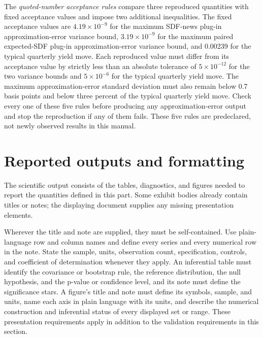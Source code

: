 \documentclass[11pt]{article}
\begin{document}
The \emph{quoted-number acceptance rules} compare three reproduced quantities with fixed acceptance
values and impose two additional inequalities. The fixed acceptance values are \(4.19\times10^{-9}\) for the maximum SDF-news plug-in approximation-error variance bound,
\(3.19\times10^{-9}\) for the maximum paired expected-SDF plug-in approximation-error variance bound, and 0.00239 for the typical quarterly
yield move. Each reproduced value must differ from its acceptance value by strictly less than an
absolute tolerance of \(5\times10^{-12}\) for the two variance bounds and
\(5\times10^{-6}\) for the typical quarterly yield move. The maximum approximation-error standard
deviation must also remain below 0.7 basis points and
below three percent of the typical quarterly yield move. Check every one of these five rules before producing any
approximation-error output and stop the reproduction if any of them fails. These five rules are predeclared,
not newly observed results in this manual.

\section{Reported outputs and formatting}
\label{sec:outputs}

The scientific output consists of the tables, diagnostics, and figures needed to report the
quantities defined in this part. Some exhibit bodies already contain titles or notes; the displaying
document supplies any missing presentation elements.

Wherever the title and note are supplied, they must be self-contained. Use plain-language row and
column names and define every series and every numerical row in the note. State the sample, units,
observation count, specification, controls, and coefficient of determination whenever they apply. An
inferential table must identify the covariance or bootstrap rule, the reference distribution, the
null hypothesis, and the p-value or confidence level, and its note must define the significance
stars. A figure's title and note must define its symbols, sample, and units, name each axis in plain
language with its units, and describe the numerical construction and inferential status of every
displayed set or range. These presentation requirements apply in
addition to the validation requirements in this section.
\end{document}
